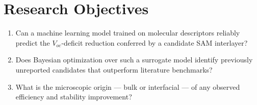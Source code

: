 \section{Research Objectives}

\begin{keybox}[title=Research Questions]
\begin{enumerate}[leftmargin=*,itemsep=2pt]
\item Can a machine learning model trained on molecular descriptors
  reliably predict the $V_{oc}$-deficit reduction conferred by a candidate
  SAM interlayer?
\item Does Bayesian optimization over such a surrogate model identify
  previously unreported candidates that outperform literature benchmarks?
\item What is the microscopic origin --- bulk or interfacial --- of any
  observed efficiency and stability improvement?
\end{enumerate}
\end{keybox}
